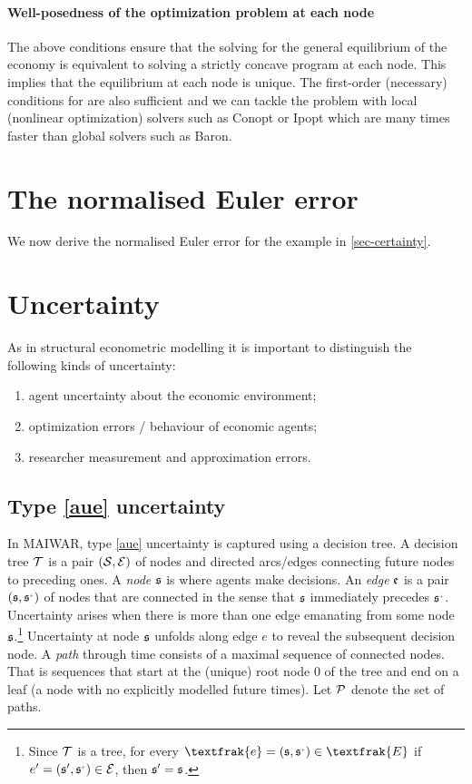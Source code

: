 \documentclass[12pt,a4paper,twoside, draft]{article}
\begin{document}
\paragraph{Well-posedness of the optimization problem at each node}
The above conditions ensure that the solving for the general equilibrium of the
economy is equivalent to solving a strictly concave program at each node.
This implies that the equilibrium at each node is unique.
The first-order (necessary) conditions for are also sufficient and we can
tackle the problem with local (nonlinear optimization) solvers such as Conopt
or Ipopt which are many times faster than global solvers such as Baron.
\section{The normalised Euler error}
We now derive the normalised Euler error for the example in
\cref{sec-certainty}.

\section{Uncertainty}
As in structural econometric modelling
\citep{Reiss_Wolak-Structural_econometrics} it is important to distinguish the
following kinds of uncertainty:
\begin{enumerate}[I]
   \item\label{aue} agent uncertainty about the economic environment;
   \item\label{aub} optimization errors / behaviour of economic agents;
   \item\label{rum} researcher measurement and approximation errors.
\end{enumerate}
\subsection{Type \ref{aue} uncertainty}
In MAIWAR, type \ref{aue} uncertainty is captured using a decision tree.
A decision tree $\mathcal T$ is a pair $(\mathcal{S}, \mathcal{E})$ of nodes and directed
arcs/edges connecting future nodes to preceding ones.
A \emph{node} $\mathfrak{s}$ is where agents make decisions.
An \emph{edge} $\mathfrak{e}$ is a pair $(\node, \node^{\mplus})$
of nodes that are connected in the sense that $\mathfrak{s}$ immediately
precedes $\node^{\mplus}$.
Uncertainty arises when there is more than one edge emanating from some node
$\mathfrak{s}$.\footnote{
  Since $\mathcal T$ is a tree, for every
  $\textfrak{e} = (\node, \node^{\mplus}) \in \textfrak{E}$
  if $e' = (\node', \node^{\mplus}) \in \mc E$,
  then $\mathfrak{s}' = \mathfrak{s}$.
}
Uncertainty at node $\mathfrak{s}$ unfolds along edge $e$ to reveal the subsequent
decision node.
A \emph{path} through time consists of a maximal sequence of connected nodes.
That is sequences that start at the (unique) root node $\mathfrak{0}$ of the
tree and end on a leaf (a node with no explicitly modelled future times).
Let $\mathcal P$ denote the set of paths.
\end{document}
